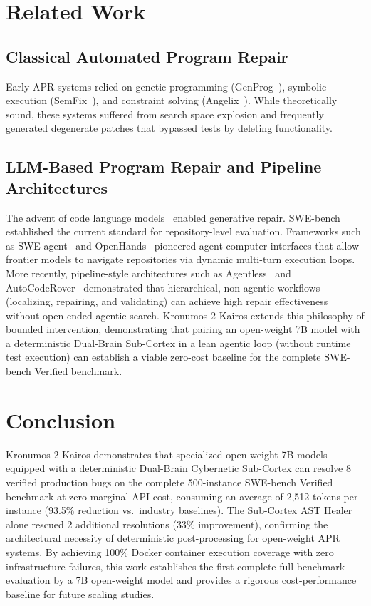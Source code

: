 \documentclass[10pt,twocolumn,letterpaper]{article}
\begin{document}
\section{Related Work}

\subsection{Classical Automated Program Repair}
Early APR systems relied on genetic programming (GenProg~\cite{le2011genprog}), symbolic execution (SemFix~\cite{nguyen2013semfix}), and constraint solving (Angelix~\cite{mechtaev2016angelix}). While theoretically sound, these systems suffered from search space explosion and frequently generated degenerate patches that bypassed tests by deleting functionality.

\subsection{LLM-Based Program Repair and Pipeline Architectures}
The advent of code language models~\cite{roziere2023code, hui2024qwen25coder} enabled generative repair. SWE-bench~\cite{jimenez2024swebench} established the current standard for repository-level evaluation. Frameworks such as SWE-agent~\cite{yang2024sweagent} and OpenHands~\cite{wang2024openhands} pioneered agent-computer interfaces that allow frontier models to navigate repositories via dynamic multi-turn execution loops. More recently, pipeline-style architectures such as Agentless~\cite{xia2024agentless} and AutoCodeRover~\cite{zhang2024autocoderover} demonstrated that hierarchical, non-agentic workflows (localizing, repairing, and validating) can achieve high repair effectiveness without open-ended agentic search. Kronumos 2 Kairos extends this philosophy of bounded intervention, demonstrating that pairing an open-weight 7B model with a deterministic Dual-Brain Sub-Cortex in a lean agentic loop (without runtime test execution) can establish a viable zero-cost baseline for the complete SWE-bench Verified benchmark.

\section{Conclusion}
Kronumos 2 Kairos demonstrates that specialized open-weight 7B models equipped with a deterministic Dual-Brain Cybernetic Sub-Cortex can resolve 8 verified production bugs on the complete 500-instance SWE-bench Verified benchmark at zero marginal API cost, consuming an average of 2,512 tokens per instance (93.5\% reduction vs.\ industry baselines). The Sub-Cortex AST Healer alone rescued 2 additional resolutions (33\% improvement), confirming the architectural necessity of deterministic post-processing for open-weight APR systems. By achieving 100\% Docker container execution coverage with zero infrastructure failures, this work establishes the first complete full-benchmark evaluation by a 7B open-weight model and provides a rigorous cost-performance baseline for future scaling studies.
\end{document}
